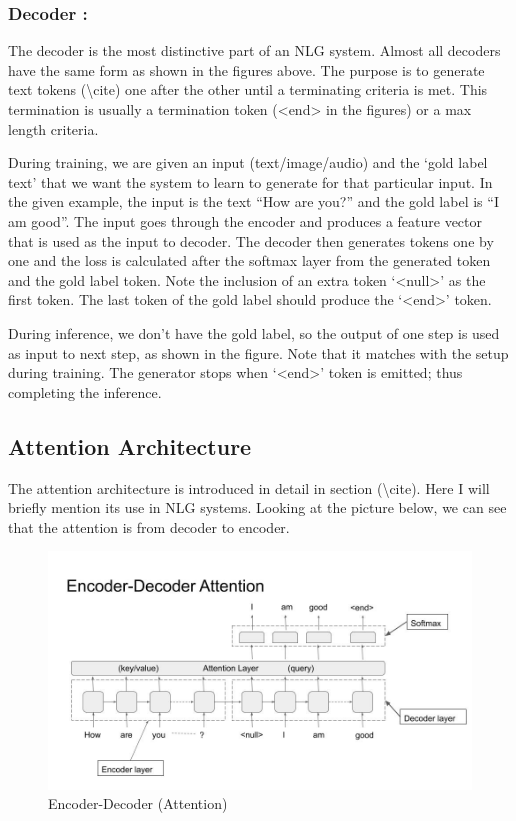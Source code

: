 \documentclass[]{krantz}
\begin{document}
\hypertarget{decoder}{%
\subsubsection{Decoder :}\label{decoder}}

The decoder is the most distinctive part of an NLG system. Almost all decoders have the same form as shown in the figures above. The purpose is to generate text tokens (\textbackslash{}cite) one after the other until a terminating criteria is met. This termination is usually a termination token (\textless{}end\textgreater{} in the figures) or a max length criteria.

During training, we are given an input (text/image/audio) and the `gold label text' that we want the system to learn to generate for that particular input. In the given example, the input is the text ``How are you?'' and the gold label is ``I am good''. The input goes through the encoder and produces a feature vector that is used as the input to decoder. The decoder then generates tokens one by one and the loss is calculated after the softmax layer from the generated token and the gold label token. Note the inclusion of an extra token `\textless{}null\textgreater{}' as the first token. The last token of the gold label should produce the `\textless{}end\textgreater{}' token.

During inference, we don't have the gold label, so the output of one step is used as input to next step, as shown in the figure. Note that it matches with the setup during training. The generator stops when `\textless{}end\textgreater{}' token is emitted; thus completing the inference.

\hypertarget{attention-architecture}{%
\subsection{Attention Architecture}\label{attention-architecture}}

The attention architecture is introduced in detail in section (\textbackslash{}cite). Here I will briefly mention its use in NLG systems. Looking at the picture below, we can see that the attention is from decoder to encoder.

\begin{figure}
\centering
\includegraphics{figures/04-01-use-case1/encoder_decoder_attn.jpg}
\caption{Encoder-Decoder (Attention)}
\end{figure}
\end{document}
